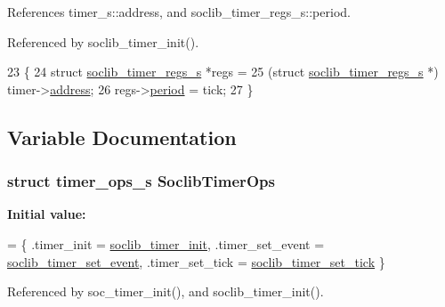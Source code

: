 References timer\-\_\-s\-::address, and soclib\-\_\-timer\-\_\-regs\-\_\-s\-::period.



Referenced by soclib\-\_\-timer\-\_\-init().


\begin{DoxyCode}
23 \{
24     \textcolor{keyword}{struct }\hyperlink{structsoclib__timer__regs__s}{soclib\_timer\_regs\_s} *regs = 
25         (\textcolor{keyword}{struct }\hyperlink{structsoclib__timer__regs__s}{soclib\_timer\_regs\_s} *) timer->\hyperlink{structtimer__s_a269237a7467e8d2423d548750a772631}{address};
26     regs->\hyperlink{structsoclib__timer__regs__s_ad9bb0a6b31bd61f2fc040498f6358af6}{period} = tick;
27 \}
\end{DoxyCode}


\subsection{Variable Documentation}
\hypertarget{soclib-timer_8c_aa3f96a0578c32ac8fd0d3b2526182084}{
\subsubsection[{Soclib\-Timer\-Ops}]{\setlength{\rightskip}{0pt plus 5cm}struct {\bf timer\-\_\-ops\-\_\-s} Soclib\-Timer\-Ops}}\label{soclib-timer_8c_aa3f96a0578c32ac8fd0d3b2526182084}
{\bfseries Initial value\-:}
\begin{DoxyCode}
= \{
    .timer\_init = \hyperlink{soclib-timer_8c_a1405d0312746c5a3b462b789940cdfcf}{soclib\_timer\_init},
    .timer\_set\_event = \hyperlink{soclib-timer_8c_a7559ec7d6e01dd48142d752e543fc689}{soclib\_timer\_set\_event},
    .timer\_set\_tick = \hyperlink{soclib-timer_8c_ac2c8f389a9bd0b9ea95d53a94678a673}{soclib\_timer\_set\_tick}
\}
\end{DoxyCode}


Referenced by soc\-\_\-timer\-\_\-init(), and soclib\-\_\-timer\-\_\-init().

